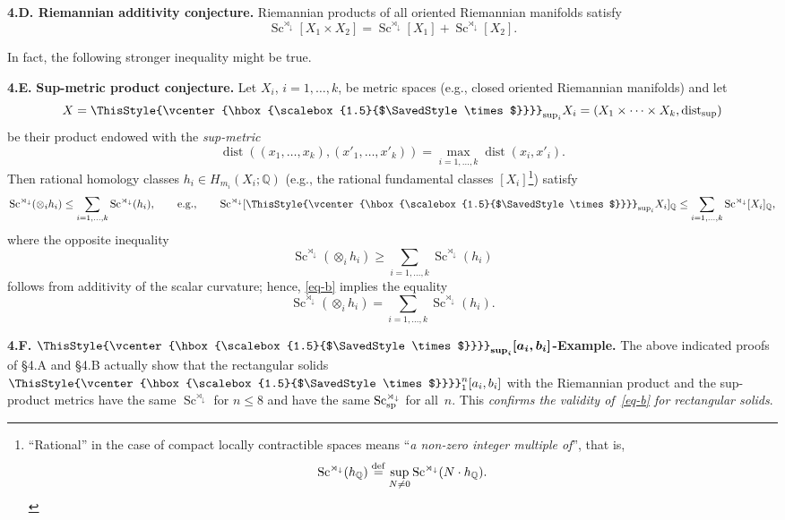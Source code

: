 \documentclass[10pt,a4paper]{amsart}
\numberwithin{equation}{section}
\newcommand\bigtimes{\mathbin{\ThisStyle{\vcenter{\hbox{%
\scalebox{1.5}{$\SavedStyle\times$}}}}}}
\begin{document}
\textbf {4.D. Riemannian additivity conjecture.}
Riemannian products of all oriented Riemannian manifolds satisfy
\[
\operatorname{Sc}^{\rtimes_\downarrow}[X_1\times X_2]= \operatorname{Sc}^{\rtimes_\downarrow}[X_1]+ \operatorname{Sc}^{\rtimes_\downarrow}[X_2].
\]

In fact, the following stronger inequality might be true.

\textbf {4.E.} \textbf{Sup-metric product conjecture.} Let $X_i$, $i=1,\dots,k$, be metric spaces (e.g., closed oriented Riemannian
 manifolds) and let
\[
X=\bigtimes_{\sup_i} X_i=
 (X_1
 \times \cdots \times X_k, \operatorname{dist}_{\sup})
 \]
be their product endowed with the {\it sup-metric}
\[
\operatorname{dist}((x_1,\dots,x_k), (x'_1,\dots,x'_k))=\max_{i=1,\dots,k} \operatorname{dist}(x_i, x'_i).
\]
Then rational homology classes $h_i\in H_{m_i}(X_i;\mathbb Q)$ (e.g., the rational fundamental classes $[X_i]$\footnote{``Rational'' in the case of compact locally contractible spaces means ``{\it a non-zero integer multiple of}'', that is,
\[
\operatorname{Sc}^{\rtimes_\downarrow}( h_\mathbb Q) \overset{\rm def}{=}
\sup_{N\neq 0}\operatorname{Sc}^{\rtimes_\downarrow}(N\cdot h_\mathbb Q).
\]})
satisfy
\begin{equation}\label{eq-b}
 \operatorname{Sc}^{\rtimes_\downarrow}( \otimes_i h_i)\leq\sum_{i=1,\dots,k} \operatorname{Sc}^{\rtimes_\downarrow}( h_i ), \qquad \text{e.g.,} \qquad \operatorname{Sc}^{\rtimes_\downarrow}[ \bigtimes_{\sup_i} X_i]_{\mathbb Q}\leq\sum_{i=1,\dots,k} \operatorname{Sc}^{\rtimes_\downarrow} [X_i]_{\mathbb Q},
 \end{equation}
where the opposite inequality
\[
\operatorname{Sc}^{\rtimes_\downarrow}( \otimes_i h_i )\geq\sum_{i=1,\dots,k} \operatorname{Sc}^{\rtimes_\downarrow}( h_i )
\]
follows from additivity of the scalar curvature;
hence, \eqref{eq-b} implies the equality
\[
 \operatorname{Sc}^{\rtimes_\downarrow} ( \otimes_i h_i) =\sum_{i=1,\dots,k} \operatorname{Sc}^{\rtimes_\downarrow} (h_i).
 \]

\textbf{4.F. $\boldsymbol{\bigtimes_{\sup_i}[a_i,b_i]}$-Example.}
The above indicated proofs of \S4.A and \S4.B actually show that the rectangular solids $\bigtimes_1^n[a_i,b_i]$ with the Riemannian product and the sup-product metrics have the same $\operatorname{Sc}^{\rtimes_\downarrow}$ for $n\leq8$ and
have the same $\operatorname{Sc}^{\rtimes_\downarrow}_{\rm sp}$ for all~$n$.
This {\it confirms the validity of~\eqref{eq-b} for rectangular solids}.
\end{document}
